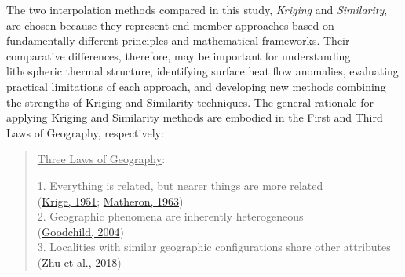 The two interpolation methods compared in this study, \emph{Kriging} and \emph{Similarity}, are chosen because they represent end-member approaches based on fundamentally different principles and mathematical frameworks. Their comparative differences, therefore, may be important for understanding lithospheric thermal structure, identifying surface heat flow anomalies, evaluating practical limitations of each approach, and developing new methods combining the strengths of Kriging and Similarity techniques. The general rationale for applying Kriging and Similarity methods are embodied in the First and Third Laws of Geography, respectively:

\begin{quote}
\uline{Three Laws of Geography}:

1. Everything is related, but nearer things are more related\\
\hspace*{0.333em}\hspace*{0.333em}\hspace*{0.333em}(\protect\hyperlink{ref-krige1951}{Krige, 1951}; \protect\hyperlink{ref-matheron1963}{Matheron, 1963})\\
2. Geographic phenomena are inherently heterogeneous\\
\hspace*{0.333em}\hspace*{0.333em}\hspace*{0.333em}(\protect\hyperlink{ref-goodchild2004}{Goodchild, 2004})\\
3. Localities with similar geographic configurations share other attributes\\
\hspace*{0.333em}\hspace*{0.333em}\hspace*{0.333em}(\protect\hyperlink{ref-zhu2018}{Zhu et al., 2018})
\end{quote}

